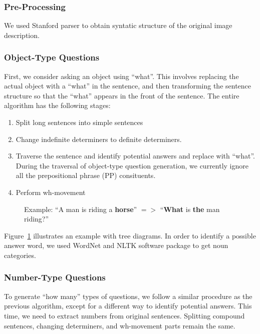 \documentclass{article}
\renewcommand{\#}[1]{\textbf{#1}}
\begin{document}
\subsubsection{Pre-Processing}
We used Stanford parser \cite{klein03} to obtain syntatic structure of the original image description.

\subsubsection{Object-Type Questions}
First, we consider asking an object using ``what''. This involves replacing the actual object with a ``what'' in the sentence, and then transforming the sentence structure so that the ``what'' appears in the front of the sentence. The entire algorithm has the following stages:
\begin{enumerate}
\item Split long sentences into simple sentences
\item Change indefinite determiners to definite determiners.
\item Traverse the sentence and identify potential answers and replace with ``what''. During the traversal of object-type question generation, we currently ignore all the prepositional phrase (PP) consituents.
\item Perform wh-movement
\end{enumerate}

\begin{figure}
    \centering
    \small
    \vspace{5mm}
    \caption{Example: ``A man is riding a \textbf{horse}'' $=>$ ``\textbf{What} is \textbf{the} man riding?''}
    \label{fig:what_gen}
\end{figure}

Figure~\ref{fig:what_gen} illustrates an example with tree diagrams. In order to identify a possible answer word, we used WordNet \cite{wordnet} and NLTK software package \cite{nltk} to get noun categories.

\subsubsection{Number-Type Questions}
To generate ``how many'' types of questions, we follow a similar procedure as the previous algorithm, except for a different way to identify potential answers. This time, we need to extract numbers from original sentences. Splitting compound sentences, changing determiners, and wh-movement parts remain the same.
\end{document}
